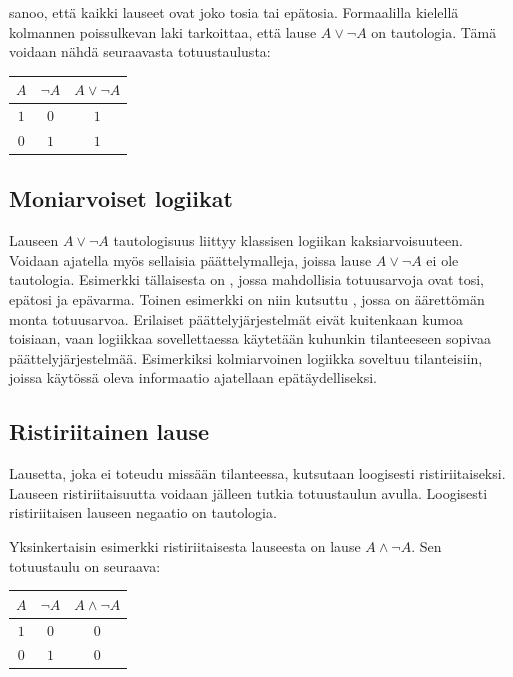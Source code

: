  sanoo, että kaikki lauseet ovat joko tosia tai epätosia. Formaalilla kielellä kolmannen poissulkevan laki tarkoittaa, että lause $A \lor \lnot A$ on tautologia. Tämä voidaan nähdä seuraavasta totuustaulusta:

\bigskip

\begin{center}
\begin{tabular}{|c|c|c|}\hline
$A$ & $\lnot A$ & $A \lor  \lnot A$ \\ \hline
$1$ & $0$ & $1$\\
$0$ & $1$ & $1$\\ \hline
\end{tabular}
\end{center}

\bigskip


\subsection*{Moniarvoiset logiikat}%
Lauseen $A \lor \lnot A$ tautologisuus liittyy klassisen logiikan kaksiarvoisuuteen. Voidaan ajatella myös sellaisia päättelymalleja, joissa lause $A \lor \lnot A$ ei ole tautologia. Esimerkki tällaisesta on , jossa mahdollisia totuusarvoja ovat tosi, epätosi ja epävarma.  Toinen esimerkki on niin kutsuttu , jossa on äärettömän monta totuusarvoa. Erilaiset päättelyjärjestelmät eivät kuitenkaan kumoa toisiaan, vaan logiikkaa sovellettaessa käytetään kuhunkin tilanteeseen sopivaa päättelyjärjestelmää. Esimerkiksi kolmiarvoinen logiikka soveltuu tilanteisiin, joissa käytössä oleva informaatio ajatellaan epätäydelliseksi.


\subsection*{Ristiriitainen lause}
Lausetta, joka ei toteudu missään tilanteessa, kutsutaan loogisesti ristiriitaiseksi. Lauseen ristiriitaisuutta voidaan jälleen tutkia totuustaulun avulla. Loogisesti ristiriitaisen lauseen negaatio on tautologia. 

Yksinkertaisin esimerkki ristiriitaisesta lauseesta on lause $A\land \lnot A$. Sen totuustaulu on seuraava:

\bigskip

\begin{center}
\begin{tabular}{|c|c|c|}\hline
$A$ & $\lnot A$ & $A \land  \lnot A$ \\ \hline
$1$ & $0$ & $0$\\
$0$ & $1$ & $0$\\ \hline
\end{tabular}
\end{center}

